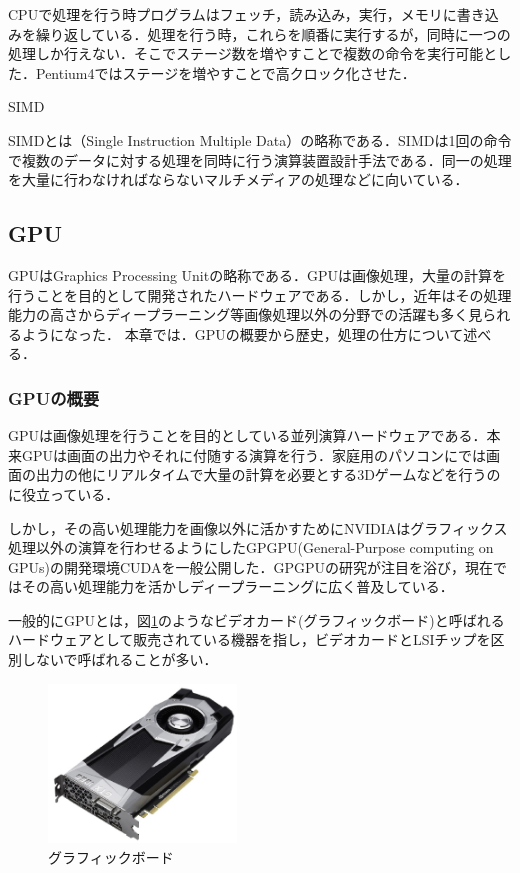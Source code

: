 \documentclass[a4j,12pt]{jsarticle}
\begin{document}
CPUで処理を行う時プログラムはフェッチ，読み込み，実行，メモリに書き込みを繰り返している．処理を行う時，これらを順番に実行するが，同時に一つの処理しか行えない．そこでステージ数を増やすことで複数の命令を実行可能とした．Pentium4ではステージを増やすことで高クロック化させた．

\begin{Large}
SIMD
\end{Large}

SIMDとは（Single Instruction Multiple Data）の略称である．SIMDは1回の命令で複数のデータに対する処理を同時に行う演算装置設計手法である．同一の処理を大量に行わなければならないマルチメディアの処理などに向いている．

\subsection{GPU}
GPUはGraphics Processing Unitの略称である．GPUは画像処理，大量の計算を行うことを目的として開発されたハードウェアである．しかし，近年はその処理能力の高さからディープラーニング等画像処理以外の分野での活躍も多く見られるようになった．
本章では．GPUの概要から歴史，処理の仕方について述べる．


\subsubsection{GPUの概要}
GPUは画像処理を行うことを目的としている並列演算ハードウェアである．本来GPUは画面の出力やそれに付随する演算を行う．家庭用のパソコンにでは画面の出力の他にリアルタイムで大量の計算を必要とする3Dゲームなどを行うのに役立っている．

しかし，その高い処理能力を画像以外に活かすためにNVIDIAはグラフィックス処理以外の演算を行わせるようにしたGPGPU(General-Purpose computing on GPUs)の開発環境CUDAを一般公開した．GPGPUの研究が注目を浴び，現在ではその高い処理能力を活かしディープラーニングに広く普及している．

一般的にGPUとは，図\ref{fig:gpu}のようなビデオカード(グラフィックボード)と呼ばれるハードウェアとして販売されている機器を指し，ビデオカードとLSIチップを区別しないで呼ばれることが多い．

\begin{figure}[htbp]
 \begin{center}
  \includegraphics[width=50mm]{GPU.pdf}
 \end{center}
 \caption{グラフィックボード}
 \label{fig:gpu}
\end{figure}
\end{document}

